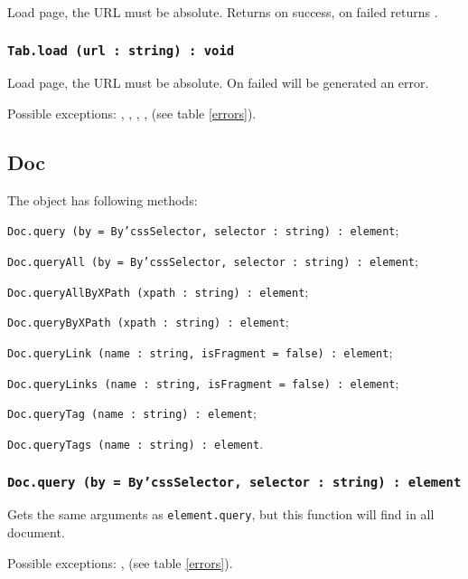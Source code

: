 Load page, the URL must be absolute. Returns \true{} on success, on failed returns \false.

\subsubsection{\texttt{Tab.load (url : string) : void}}

Load page, the URL must be absolute. On failed will be generated an error.

Possible exceptions: , , , ,  (see table \ref{errors}).

\subsection{Doc}

The object \dom{} has following methods:
\begin{icItems}
	\item \texttt{Doc.query (by = By'cssSelector, selector : string) : element};
	\item \texttt{Doc.queryAll (by = By'cssSelector, selector : string) : element};
	\item \texttt{Doc.queryAllByXPath (xpath : string) : element};
	\item \texttt{Doc.queryByXPath (xpath : string) : element};
	\item \texttt{Doc.queryLink (name : string, isFragment = false) : element};
	\item \texttt{Doc.queryLinks (name : string, isFragment = false) : element};
	\item \texttt{Doc.queryTag (name : string) : element};
	\item \texttt{Doc.queryTags (name : string) : element}.
\end{icItems}

\subsubsection{\texttt{Doc.query (by = By'cssSelector, selector : string) : element}}

Gets the same arguments as \texttt{element.query}, but this function will find in all document.

Possible exceptions: ,  (see table \ref{errors}).

